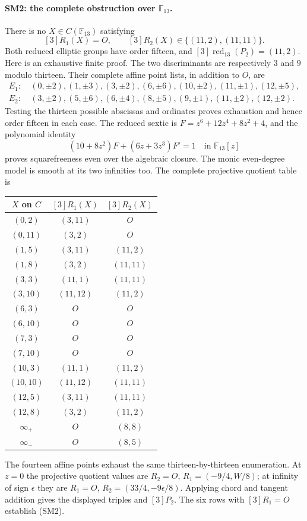 \paragraph{SM2: the complete obstruction over $\mathbb F_{13}$.}
There is no $X\in C(\mathbb F_{13})$ satisfying
\[
 [3]R_1(X)=O,\qquad [3]R_2(X)\in\{(11,2),(11,11)\}.
 \tag{SM2}
\]
Both reduced elliptic groups have order fifteen, and
$[3]\operatorname{red}_{13}(P_2)=(11,2)$.
Here is an exhaustive finite proof. The two discriminants are
respectively $3$ and $9$ modulo thirteen. Their complete affine point
lists, in addition to $O$, are
\[
\begin{split}
 E_1:&\ (0,\pm2),(1,\pm3),(3,\pm2),(6,\pm6),
       (10,\pm2),(11,\pm1),(12,\pm5),\\
 E_2:&\ (3,\pm2),(5,\pm6),(6,\pm4),(8,\pm5),
       (9,\pm1),(11,\pm2),(12,\pm2).
\end{split}
\]
Testing the thirteen possible abscissas and ordinates proves exhaustion
and hence order fifteen in each case. The reduced sextic is
$F=z^6+12z^4+8z^2+4$, and the polynomial identity
\[
 (10+8z^2)F+(6z+3z^3)F'=1\quad\text{in }\mathbb F_{13}[z]
\]
proves squarefreeness even over the algebraic closure. The monic
even-degree model is smooth at its two infinities too.
The complete projective quotient table is
\begin{center}
\begin{tabular}{c|c|c}
 $X$ on $C$ & $[3]R_1(X)$ & $[3]R_2(X)$\\\hline
 $(0,2)$ & $(3,11)$ & $O$\\
 $(0,11)$ & $(3,2)$ & $O$\\
 $(1,5)$ & $(3,11)$ & $(11,2)$\\
 $(1,8)$ & $(3,2)$ & $(11,11)$\\
 $(3,3)$ & $(11,1)$ & $(11,11)$\\
 $(3,10)$ & $(11,12)$ & $(11,2)$\\
 $(6,3)$ & $O$ & $O$\\
 $(6,10)$ & $O$ & $O$\\
 $(7,3)$ & $O$ & $O$\\
 $(7,10)$ & $O$ & $O$\\
 $(10,3)$ & $(11,1)$ & $(11,2)$\\
 $(10,10)$ & $(11,12)$ & $(11,11)$\\
 $(12,5)$ & $(3,11)$ & $(11,11)$\\
 $(12,8)$ & $(3,2)$ & $(11,2)$\\
 $\infty_+$ & $O$ & $(8,8)$\\
 $\infty_-$ & $O$ & $(8,5)$
\end{tabular}
\end{center}
The fourteen affine points exhaust the same thirteen-by-thirteen
enumeration. At $z=0$ the projective quotient values are
$R_2=O$, $R_1=(-9/4,W/8)$; at infinity of sign $\epsilon$ they are
$R_1=O$, $R_2=(33/4,-9\epsilon/8)$. Applying chord and tangent
addition gives the displayed triples and $[3]P_2$.
The six rows with $[3]R_1=O$ establish (SM2).

